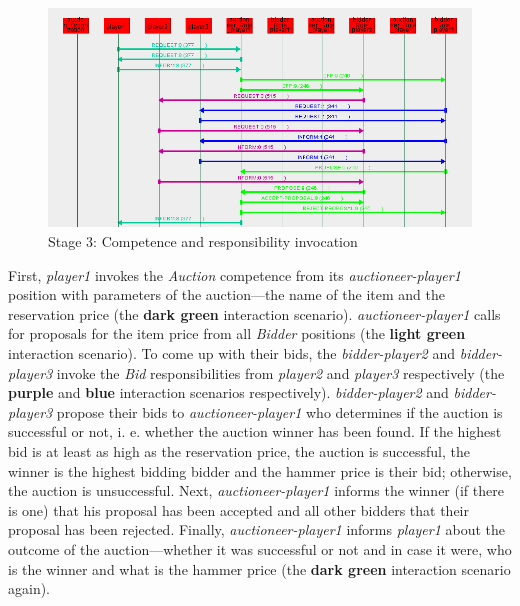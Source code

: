 \begin{figure}[H]
	\centering
	\includegraphics[width=\textwidth]{images/examples/example3-stageA3.png}
	\caption{Stage 3: Competence and responsibility invocation}
	\label{figure:example3-stageA3}
\end{figure}

First, \textit{player1} invokes the \textit{Auction} competence from its \textit{auctioneer-player1} position with parameters of the auction---the name of the item and the reservation price (the \textbf{dark green} interaction scenario).
\textit{auctioneer-player1} calls for proposals for the item price from all \textit{Bidder} positions (the \textbf{light green} interaction scenario).
To come up with their bids, the \textit{bidder-player2} and \textit{bidder-player3} invoke the \textit{Bid} responsibilities from \textit{player2} and \textit{player3} respectively (the \textbf{purple} and \textbf{blue} interaction scenarios respectively).
\textit{bidder-player2} and \textit{bidder-player3} propose their bids to \textit{auctioneer-player1} who determines if the auction is successful or not, i. e. whether the auction winner has been found.
If the highest bid is at least as high as the reservation price, the auction is successful, the winner is the highest bidding bidder and the hammer price is their bid; otherwise, the auction is unsuccessful.
Next, \textit{auctioneer-player1} informs the winner (if there is one) that his proposal has been accepted and all other bidders that their proposal has been rejected.
Finally, \textit{auctioneer-player1} informs \textit{player1} about the outcome of the auction---whether it was successful or not and in case it were, who is the winner and what is the hammer price (the \textbf{dark green} interaction scenario again).